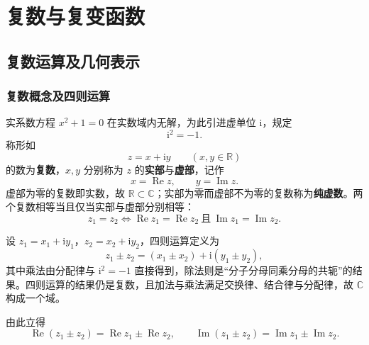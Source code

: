 
\chapter{复数与复变函数}

\section{复数运算及几何表示}

\subsection{复数概念及四则运算}
实系数方程 \(x^{2}+1=0\) 在实数域内无解，为此引进虚单位 \(\mathrm{i}\)，规定
\[
\mathrm{i}^{2}=-1 .
\]
称形如
\[
z=x+\mathrm{i}y\qquad (x,y\in\mathbb{R})
\]
的数为\textbf{复数}，\(x,y\) 分别称为 \(z\) 的\textbf{实部}与\textbf{虚部}，记作
\[
x=\operatorname{Re}z,\qquad y=\operatorname{Im}z .
\]
虚部为零的复数即实数，故 \(\mathbb{R}\subset\mathbb{C}\)；实部为零而虚部不为零的复数称为\textbf{纯虚数}。两个复数相等当且仅当实部与虚部分别相等：
\[
z_{1}=z_{2}\iff \operatorname{Re}z_{1}=\operatorname{Re}z_{2}\ \text{且}\ \operatorname{Im}z_{1}=\operatorname{Im}z_{2}.
\]

设 \(z_{1}=x_{1}+\mathrm{i}y_{1}\)，\(z_{2}=x_{2}+\mathrm{i}y_{2}\)，四则运算定义为
\[
z_{1}\pm z_{2}=(x_{1}\pm x_{2})+\mathrm{i}(y_{1}\pm y_{2}),
\]
其中乘法由分配律与 \(\mathrm{i}^{2}=-1\) 直接得到，除法则是“分子分母同乘分母的共轭”的结果。四则运算的结果仍是复数，且加法与乘法满足交换律、结合律与分配律，故 \(\mathbb{C}\) 构成一个域。

由此立得
\[
\operatorname{Re}(z_{1}\pm z_{2})=\operatorname{Re}z_{1}\pm\operatorname{Re}z_{2},\qquad
\operatorname{Im}(z_{1}\pm z_{2})=\operatorname{Im}z_{1}\pm\operatorname{Im}z_{2}.
\]


